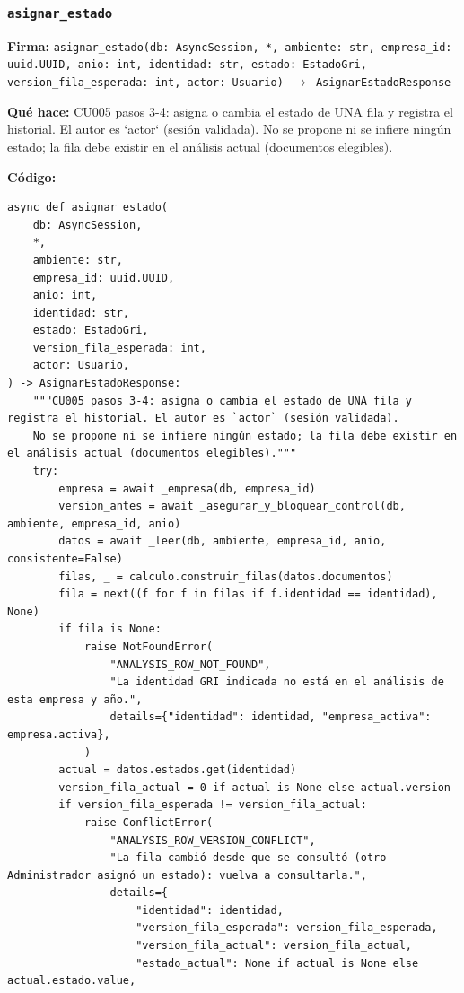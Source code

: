\documentclass[11pt,a4paper]{article}
\begin{document}
\subsubsection*{\texttt{asignar\_estado}}
\textbf{Firma:} \texttt{asignar\_estado(db: AsyncSession, *, ambiente: str, empresa\_id: uuid.UUID, anio: int, identidad: str, estado: EstadoGri, version\_fila\_esperada: int, actor: Usuario) $\rightarrow$ AsignarEstadoResponse}

\textbf{Qué hace:} CU005 pasos 3-4: asigna o cambia el estado de UNA fila y registra el historial. El autor es `actor` (sesión validada).
No se propone ni se infiere ningún estado; la fila debe existir en el análisis actual (documentos elegibles).

\textbf{Código:}
\begin{lstlisting}
async def asignar_estado(
    db: AsyncSession,
    *,
    ambiente: str,
    empresa_id: uuid.UUID,
    anio: int,
    identidad: str,
    estado: EstadoGri,
    version_fila_esperada: int,
    actor: Usuario,
) -> AsignarEstadoResponse:
    """CU005 pasos 3-4: asigna o cambia el estado de UNA fila y registra el historial. El autor es `actor` (sesión validada).
    No se propone ni se infiere ningún estado; la fila debe existir en el análisis actual (documentos elegibles)."""
    try:
        empresa = await _empresa(db, empresa_id)
        version_antes = await _asegurar_y_bloquear_control(db, ambiente, empresa_id, anio)
        datos = await _leer(db, ambiente, empresa_id, anio, consistente=False)
        filas, _ = calculo.construir_filas(datos.documentos)
        fila = next((f for f in filas if f.identidad == identidad), None)
        if fila is None:
            raise NotFoundError(
                "ANALYSIS_ROW_NOT_FOUND",
                "La identidad GRI indicada no está en el análisis de esta empresa y año.",
                details={"identidad": identidad, "empresa_activa": empresa.activa},
            )
        actual = datos.estados.get(identidad)
        version_fila_actual = 0 if actual is None else actual.version
        if version_fila_esperada != version_fila_actual:
            raise ConflictError(
                "ANALYSIS_ROW_VERSION_CONFLICT",
                "La fila cambió desde que se consultó (otro Administrador asignó un estado): vuelva a consultarla.",
                details={
                    "identidad": identidad,
                    "version_fila_esperada": version_fila_esperada,
                    "version_fila_actual": version_fila_actual,
                    "estado_actual": None if actual is None else actual.estado.value,

\end{lstlisting}
\end{document}
